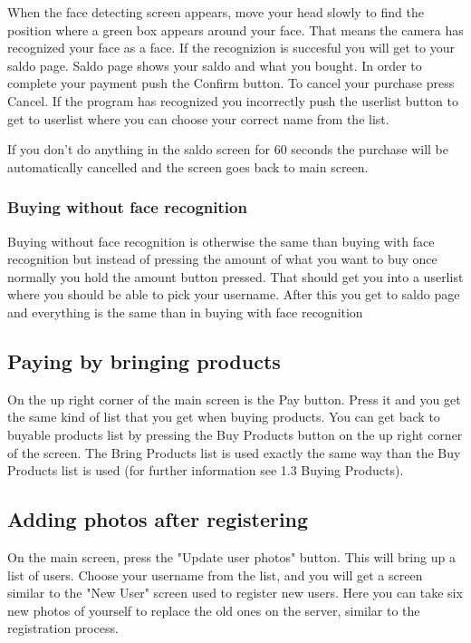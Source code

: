 \documentclass[11pt]{article}
\begin{document}
When the face detecting screen appears, move your head slowly to find the position where a green box appears around your face. That means the camera has recognized your face as a face. If the recognizion is succesful you will get to your saldo page. Saldo page shows your saldo and what you bought. In order to complete your payment push the Confirm button. To cancel your purchase press Cancel. If the program has recognized you incorrectly push the userlist button to get to userlist where you can choose your correct name from the list.

If you don’t do anything in the saldo screen for 60 seconds the purchase will be automatically cancelled and the screen goes back to main screen.

\subsubsection*{Buying without face recognition}
Buying without face recognition is otherwise the same than buying with face recognition but instead of pressing the amount of what you want to buy once normally you hold the amount button pressed. That should get you into a userlist where you should be able to pick your username. After this you get to saldo page and everything is the same than in buying with face recognition

\subsection{Paying by bringing products}

On the up right corner of the main screen is the Pay button. Press it and you get the same kind of list that you get when buying products. You can get back to buyable products list by pressing the Buy Products button on the up right corner of the screen. The Bring Products list is used exactly the same way than the Buy Products list is used (for further information see 1.3 Buying Products).

\subsection{Adding photos after registering}

On the main screen, press the "Update user photos" button. This will bring up a list of users. Choose your username from the list, and you will get a screen similar to the "New User" screen used to register new users. Here you can take six new photos of yourself to replace the old ones on the server, similar to the registration process.
\end{document}
